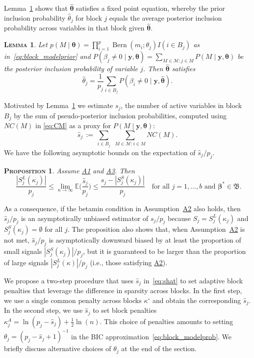 \documentclass[
  12pt]{article}
\newcommand{\E}{\mathbb{E}}
\newcommand{\M}{\mathcal{M}}
\newcommand{\by}{\mathbf{y}}
\newcommand{\bbeta}{\boldsymbol{\beta}}
\newcommand{\btheta}{\boldsymbol{\theta}}
\newtheorem{prop}[thm]{\textsc{Proposition}}
\newtheorem{lem}[thm]{\textsc{Lemma}}
\begin{document}
Lemma~\ref{lem:empiricalbayesinterpret} shows that $\hat{\btheta}$ satisfies a fixed point equation, whereby the prior inclusion probability $\hat{\theta}_j$ for block $j$ equals the average posterior inclusion probability across variables in that block given $\hat{\btheta}$.
\begin{lem}\label{lem:empiricalbayesinterpret} 
Let $p(M \mid \btheta)= \prod_{i=1}^p \operatorname{Bern}\left(m_i ; \theta_j\right) I(i \in B_j)$ as in~\eqref{eq:block_modelprior} and $P(\beta_j \neq 0 \mid \by, \btheta)= \sum_{M\in\M: j\in M} P(M \mid \by,\btheta)$ be the posterior inclusion probability of variable $j$. Then $\hat{\btheta}$ satisfies 
\[\hat{\theta}_j= \frac{1}{p_j}\sum_{i\in B_j} P(\beta_i \neq 0 \mid \by, \hat{\btheta}).
\]
\end{lem}

Motivated by Lemma~\ref{lem:empiricalbayesinterpret} we estimate $s_j$, the number of active variables in block $B_j$ by the sum of pseudo-posterior inclusion probabilities,
computed using $NC(M)$ in \eqref{eq:CM} as a proxy for $P(M\mid \by,\btheta)$:
\begin{equation}\label{eq:shat}
    \hat{s}_j \,:=\, \sum_{i\in B_j}\,\,\sum_{M\in \M : i \in M}NC(M).
\end{equation}
We have the following asymptotic bounds on the expectation of $\hat{s}_j/p_j$. 
\begin{prop}
    \label{prop:shatconsistence}
Assume \hyperlink{lab:A1}{A1} and \hyperlink{lab:A3}{A3}. Then
\[ \,\, \frac{|S_j^{L}(\kappa_j)|}{p_j}\leq \lim_{n\to\infty}\E\bigg(\frac{\hat{s}_j}{p_j}\bigg)\leq \frac{s_j-|S_j^{S}(\kappa_j)|}{p_j}\quad\text{for all }j=1,\ldots,b \text{ and }\bbeta^*\in\mathfrak{B}.\]

\end{prop}
As a consequence, if the betamin condition in Assumption~\hyperlink{lab:A2}{A2} also holds, then $\hat{s}_j/p_j$ is an asymptotically unbiased
estimator of $s_j/p_j$ because $S_j=S_j^{L}(\kappa_j)$ and $S_j^{S}(\kappa_j)=\emptyset$ for all $j$. 
The proposition also shows that, when Assumption~\hyperlink{lab:A2}{A2} is not met, $\hat{s}_j/p_j$ is asymptotically downward biased by at least the proportion of small signals $|S_j^{S}(\kappa_j)|/p_j$, but it is guaranteed to be larger than the proportion of large signals $|S_j^L(\kappa)|/p_j$ (i.e., those satisfying \hyperlink{lab:A2}{A2}).

We propose a two-step procedure that uses $\hat{s}_j$ in~\eqref{eq:shat} to set adaptive block penalties that leverage the difference in sparsity across blocks. 
In the first step,  we use a single common penalty across blocks $\kappa^{\circ}$ and obtain the corresponding $\hat{s}_j$.
In the second step, we use $\hat{s}_j$ to set block penalties $\kappa_j^{A}= \ln(p_j-\hat{s}_j)+ \tfrac{1}{2}\ln(n)$.
This choice of penalties amounts to setting $\theta_j= (p_j-\hat{s}_j+1)^{-1}$ in the BIC approximation~\eqref{eq:block_modelprob}.
We briefly discuss alternative choices of $\theta_j$ at the end of the section.
\end{document}
